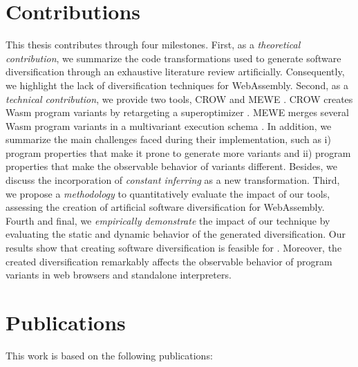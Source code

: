 \renewcommand{\rqone}{$RQ_1$. To what extent can we artifically generate program variants for WebAssembly?}

\renewcommand{\rqtwo}{$RQ_2$. To what extent are the generated variants dynamically different?}
\renewcommand{\rqthree}{$RQ_3$. To what extent do the artificial variants exhibit different execution times on Edge-Cloud platforms?}

\section{Contributions}

This thesis contributes through four milestones. First, as a \emph{theoretical contribution}, we summarize the code transformations used to generate software diversification through an exhaustive literature review artificially. Consequently, we highlight the lack of diversification techniques for WebAssembly.
Second, as a \emph{technical contribution}, we provide two tools, CROW \cite{CROW} and MEWE \cite{MEWE}. CROW creates 
Wasm program variants by retargeting a superoptimizer \cite{Sasnauskas2017Souper:Superoptimizer}.
MEWE merges several Wasm program variants in a multivariant execution schema \cite{okhravi2013survey}.
In addition, we summarize the main challenges faced during their implementation, such as i) program properties that make it prone to generate more variants and ii) program properties that make the observable behavior of variants different. 
Besides, we discuss the incorporation of \emph{constant inferring} as a new transformation. 
Third, we propose a \emph{methodology} to quantitatively evaluate the impact of our tools, assessing the creation of artificial software diversification for WebAssembly. 
Fourth and final, we \emph{empirically demonstrate} the impact of our technique by evaluating the static and dynamic behavior of the generated diversification.
Our results show that creating software diversification is feasible for \wasm. 
Moreover, the created diversification remarkably affects the observable behavior of program variants in web browsers and standalone interpreters.

\section{Publications}

This work is based on the following publications:

